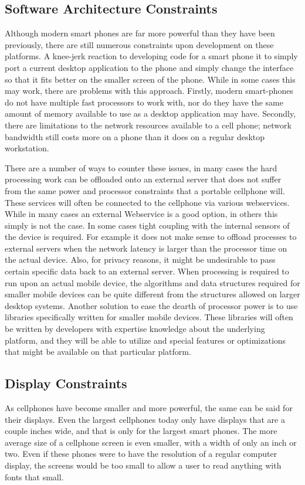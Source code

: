 \documentclass{acm_proc_article-sp}
\begin{document}
\subsection{Software Architecture Constraints}
Although modern smart phones are far more powerful than they have been previously, there are still numerous constraints upon development on these platforms.  A knee-jerk reaction to developing code for a smart phone it to simply port a current desktop application to the phone and simply change the interface so that it fits better on the smaller screen of the phone.  While in some cases this may work, there are problems with this approach.  Firstly, modern smart-phones do not have multiple fast processors to work with, nor do they have the same amount of memory available to use as a desktop application may have.  Secondly, there are limitations to the network resources available to a cell phone; network bandwidth still costs more on a phone than it does on a regular desktop workstation.  \cite{wagner2009making}  

There are a number of ways to counter these issues, in many cases the hard processing work can be offloaded onto an external server that does not suffer from the same power and processor constraints that a portable cellphone will. These services will often be connected to the cellphone via various webservices. While in many cases an external Webservice is a good option, in others this simply is not the case. In some cases tight coupling with the internal sensors of the device is required.  For example it does not make sense to offload processes to external servers when the network latency is larger than the processor time on the actual device.  Also, for privacy reasons, it might be undesirable to pass certain specific data back to an external server. When processing is required to run upon an actual mobile device, the algorithms and data structures required for smaller mobile devices can be quite different from the structures allowed on larger desktop systems.  \cite{wagner2009making} Another solution to ease the dearth of processor power is to use libraries specifically written for smaller mobile devices.  These libraries will often be written by developers with expertise knowledge about the underlying platform, and they will be able to utilize and special features or optimizations that might be available on that particular platform.  

\subsection{Display Constraints}
As cellphones have become smaller and more powerful, the same can be said for their displays.  Even the largest cellphones today only have displays that are a couple inches wide, and that is only for the largest smart phones.  The more average size of a cellphone screen is even smaller, with a width of only an inch or two.  Even if these phones were to have the resolution of a regular computer display, the screens would be too small to allow a user to read anything with fonts that small.
\end{document}
